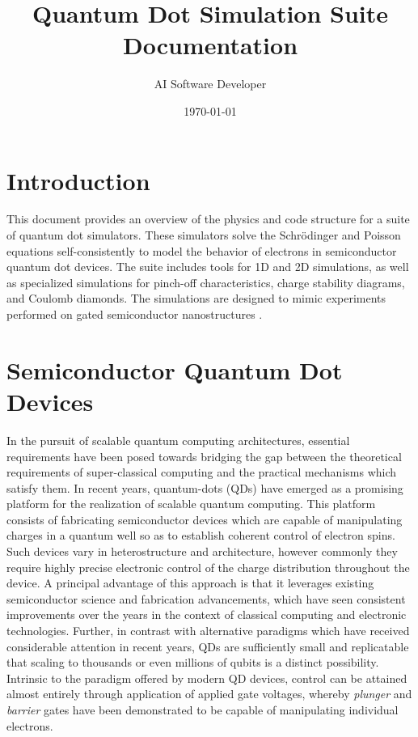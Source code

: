 \documentclass{article}
\title{Quantum Dot Simulation Suite Documentation}
\author{AI Software Developer}
\date{\today}
\begin{document}
\maketitle
\tableofcontents
\newpage

\section{Introduction}
This document provides an overview of the physics and code structure for a suite of quantum dot simulators. These simulators solve the Schrödinger and Poisson equations self-consistently to model the behavior of electrons in semiconductor quantum dot devices. The suite includes tools for 1D and 2D simulations, as well as specialized simulations for pinch-off characteristics, charge stability diagrams, and Coulomb diamonds. The simulations are designed to mimic experiments performed on gated semiconductor nanostructures \cite{example}.

\section{Semiconductor Quantum Dot Devices}
In the pursuit of scalable quantum computing architectures, essential requirements have been posed towards bridging the gap between the theoretical requirements of super-classical computing and the practical mechanisms which satisfy them. In recent years, quantum-dots (QDs) have emerged as a promising platform for the realization of scalable quantum computing. This platform consists of fabricating semiconductor devices which are capable of manipulating charges in a quantum well so as to establish coherent control of electron spins. Such devices vary in heterostructure and architecture, however commonly they require highly precise electronic control of the charge distribution throughout the device. A principal advantage of this approach is that it leverages existing semiconductor science and fabrication advancements, which have seen consistent improvements over the years in the context of classical computing and electronic technologies. Further, in contrast with alternative paradigms which have received considerable attention in recent years, QDs are sufficiently small and replicatable that scaling to thousands or even millions of qubits is a distinct possibility. Intrinsic to the paradigm offered by modern QD devices, control can be attained almost entirely through application of applied gate voltages, whereby \textit{plunger} and \textit{barrier} gates have been demonstrated to be capable of manipulating individual electrons.
\end{document}
